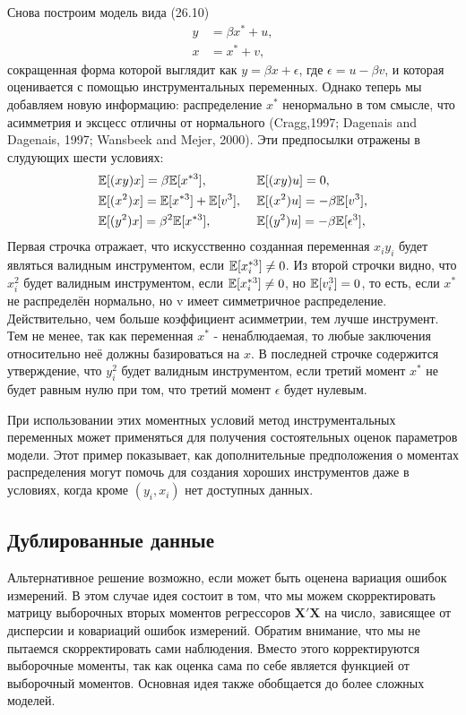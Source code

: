 Снова построим модель вида (26.10)
\begin{align*}
y&=\beta x^* + u, \\
x&=x^*+v,
\end{align*}
сокращенная форма которой выглядит как $y=\beta x+ \epsilon$, где $\epsilon = u- \beta v$, и которая оценивается с помощью инструментальных переменных. Однако теперь мы добавляем новую информацию: распределение $x^*$ ненормально в том смысле, что асимметрия и эксцесс отличны от нормального (Cragg,1997; Dagenais and Dagenais, 1997; Wansbeek and Mejer, 2000). Эти предпосылки отражены в слудующих шести условиях:
\begin{align*}
&\mathbb{E} [(xy)x]=\beta \mathbb{E} [x^{*3}], &\ &\mathbb{E} [(xy)u]=0, \\
&\mathbb{E} [(x^2)x]=\mathbb{E} [x^{*3}]+\mathbb{E} [v^3],&\ &\mathbb{E} [(x^2)u]=-\beta \mathbb{E} [v^3], \\
&\mathbb{E} [(y^2)x]=\beta^2 \mathbb{E} [x^{*3}],&\ &\mathbb{E} [(y^2)u]=-\beta \mathbb{E} [\epsilon^3],
\end{align*}
Первая строчка отражает, что искусственно созданная переменная $x_i y_i$ будет являться валидным инструментом, если $\mathbb{E}[x^{*3}_i] \neq 0$.  Из второй строчки видно, что $x^2_i$ будет валидным инструментом, если  $\mathbb{E}[x^{*3}_i] \neq 0$, но  $\mathbb{E}[v^3_i] = 0$, то есть, если $x^*$ не распределён нормально, но v имеет симметричное распределение. Действительно, чем больше коэффициент асимметрии, тем лучше инструмент. Тем не менее, так как переменная $x^*$ - ненаблюдаемая, то любые заключения относительно неё должны базироваться на $x$. В последней строчке содержится утверждение, что $y_i^2$ будет валидным инструментом, если третий момент $x^*$ не будет равным нулю при том, что третий момент $\epsilon$ будет нулевым.

При использовании этих моментных условий метод инструментальных переменных может применяться для получения состоятельных оценок параметров модели. Этот пример показывает, как дополнительные предположения о моментах распределения могут помочь для создания хороших инструментов даже в условиях, когда кроме $(y_i, x_i)$ нет доступных данных.

\subsection{Дублированные данные} 
Альтернативное решение возможно, если может быть оценена вариация ошибок измерений. В этом случае идея состоит в том, что мы можем скорректировать матрицу выборочных вторых моментов регрессоров $\mathbf{X'X}$ на число, зависящее от дисперсии и ковариаций ошибок измерений. Обратим внимание, что мы не пытаемся скорректировать сами наблюдения. Вместо этого корректируются выборочные моменты, так как оценка сама по себе является функцией от выборочный моментов. Основная идея также обобщается до более сложных моделей.

